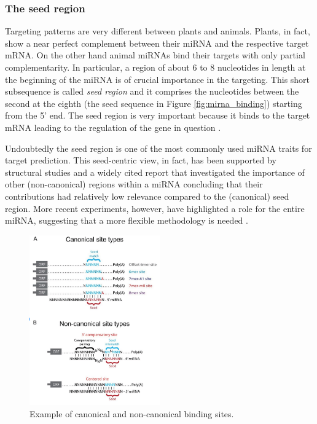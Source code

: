 \subsubsection{The seed region}
Targeting patterns are very different between plants and animals. Plants, in fact, show a near perfect complement between their miRNA and the respective target mRNA. On the other hand animal miRNAs bind their targets with only partial complementarity. In particular, a region of about 6 to 8 nucleotides in length at the beginning of the miRNA is of crucial importance in the targeting.  This short subsequence is called \emph{seed region} and it comprises the nucleotides between the second at the eighth (the seed sequence in Figure \ref{fig:mirna_binding}) starting from the 5' end. 
The seed region is very important because it binds to the target mRNA leading to the regulation of the gene in question \cite{mirna_overview}.

Undoubtedly the seed region is one of the most commonly used miRNA traits for target prediction. This seed-centric view, in fact,  has been supported by structural studies \cite{structural_basis} and a widely cited report  \cite{canonical_target} that investigated the importance of other (non-canonical) regions within a miRNA concluding that their contributions had relatively low relevance compared to the (canonical)
seed region. More recent experiments, however, have highlighted a role for the entire miRNA, suggesting that a more flexible methodology is needed \cite{helwak}.

\begin{figure}[hbt!]
	\centering
	\includegraphics[width=0.5\textwidth]{Figures/canonical_noncanonical}
	\caption{Example of canonical and non-canonical binding sites.}
	\label{fig:canonical_binding}
\end{figure}

